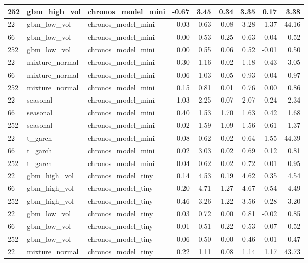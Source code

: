 {\begin{tabular}{lllrrrrrr}
252 & gbm\_high\_vol & chronos\_model\_mini & -0.67 & 3.45 & 0.34 & 3.35 & 0.17 & 3.38 \\
\midrule
22 & gbm\_low\_vol & chronos\_model\_mini & -0.03 & 0.63 & -0.08 & 3.28 & 1.37 & 44.16 \\
66 & gbm\_low\_vol & chronos\_model\_mini & 0.00 & 0.53 & 0.25 & 0.63 & 0.04 & 0.52 \\
252 & gbm\_low\_vol & chronos\_model\_mini & 0.00 & 0.55 & 0.06 & 0.52 & -0.01 & 0.50 \\
\midrule
22 & mixture\_normal & chronos\_model\_mini & 0.30 & 1.16 & 0.02 & 1.18 & -0.43 & 3.05 \\
66 & mixture\_normal & chronos\_model\_mini & 0.06 & 1.03 & 0.05 & 0.93 & 0.04 & 0.97 \\
252 & mixture\_normal & chronos\_model\_mini & 0.15 & 0.81 & 0.01 & 0.76 & 0.00 & 0.86 \\
\midrule
22 & seasonal & chronos\_model\_mini & 1.03 & 2.25 & 0.07 & 2.07 & 0.24 & 2.34 \\
66 & seasonal & chronos\_model\_mini & 0.40 & 1.53 & 1.70 & 1.63 & 0.42 & 1.68 \\
252 & seasonal & chronos\_model\_mini & 0.02 & 1.59 & 1.09 & 1.56 & 0.61 & 1.37 \\
\midrule
22 & t\_garch & chronos\_model\_mini & 0.08 & 0.62 & 0.02 & 0.64 & 1.55 & 44.39 \\
66 & t\_garch & chronos\_model\_mini & 0.02 & 3.03 & 0.02 & 0.69 & 0.12 & 0.81 \\
252 & t\_garch & chronos\_model\_mini & 0.04 & 0.62 & 0.02 & 0.72 & 0.01 & 0.95 \\
\midrule
22 & gbm\_high\_vol & chronos\_model\_tiny & 0.14 & 4.53 & 0.19 & 4.62 & 0.35 & 4.54 \\
66 & gbm\_high\_vol & chronos\_model\_tiny & 0.20 & 4.71 & 1.27 & 4.67 & -0.54 & 4.49 \\
252 & gbm\_high\_vol & chronos\_model\_tiny & 0.46 & 3.26 & 1.22 & 3.56 & -0.28 & 3.20 \\
\midrule
22 & gbm\_low\_vol & chronos\_model\_tiny & 0.03 & 0.72 & 0.00 & 0.81 & -0.02 & 0.85 \\
66 & gbm\_low\_vol & chronos\_model\_tiny & 0.01 & 0.51 & 0.22 & 0.53 & -0.07 & 0.52 \\
252 & gbm\_low\_vol & chronos\_model\_tiny & 0.06 & 0.50 & 0.00 & 0.46 & 0.01 & 0.47 \\
\midrule
22 & mixture\_normal & chronos\_model\_tiny & 0.22 & 1.11 & 0.08 & 1.14 & 1.17 & 43.73 \\

\end{tabular}}
